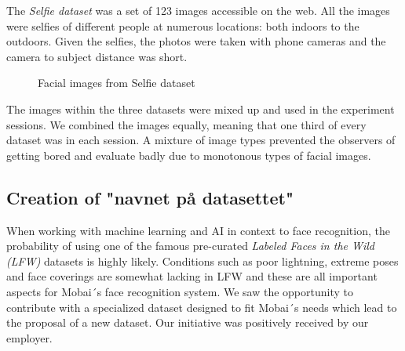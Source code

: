 \noindent The \textit{Selfie dataset} was a set of 123 images accessible on the web. All the images were selfies of different people at numerous locations: both indoors to the outdoors. Given the selfies, the photos were taken with phone cameras and the camera to subject distance was short. 
\begin{figure}[h]
    \centering
    \qquad
    \caption{Facial images from Selfie dataset}
    \label{fig:selfie_dataset}
\end{figure}

\noindent The images within the three datasets were mixed up and used in the experiment sessions. We combined the images equally, meaning that one third of every dataset was in each session. A mixture of image types prevented the observers of getting bored and evaluate badly due to monotonous types of facial images. 


\subsection{Creation of "navnet på datasettet"}
When working with machine learning and AI in context to face recognition, the probability of using one of the famous pre-curated \textit{Labeled Faces in the Wild (LFW)} datasets is highly likely. Conditions such as poor lightning, extreme poses and face coverings are somewhat lacking in LFW and these are all important aspects for Mobai´s face recognition system. We saw the opportunity to contribute with a specialized dataset designed to fit Mobai´s needs which lead to the proposal of a new dataset. Our initiative was positively received by our employer. 

